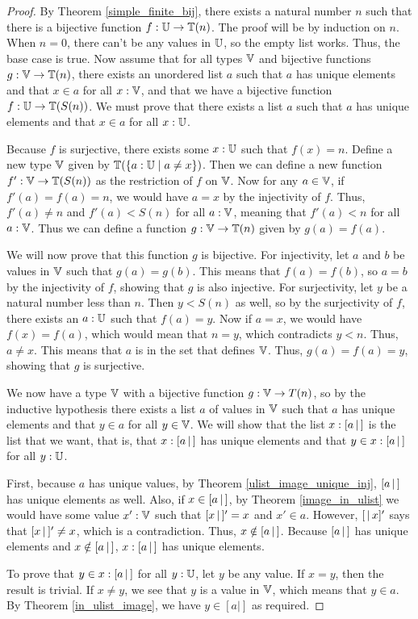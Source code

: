 \documentclass[../../math.tex]{subfiles}
\begin{document}
\begin{proof}
    By Theorem \ref{simple_finite_bij}, there exists a natural number $n$ such
    that there is a bijective function $f : \mathbb{U} \to \mathbb{T}(n)$.  The proof will be by
    induction on $n$.  When $n = 0$, there can't be any values in $\mathbb{U}$, so the
    empty list works.  Thus, the base case is true.  Now assume that for all
    types $\mathbb{V}$ and bijective functions $g : \mathbb{V} \to \mathbb{T}(n)$, there exists an
    unordered list $a$ such that $a$ has unique elements and that $x \in a$ for
    all $x : \mathbb{V}$, and that we have a bijective function $f : \mathbb{U} \to \mathbb{T}(S(n))$.
    We must prove that there exists a list $a$ such that $a$ has unique elements
    and that $x \in a$ for all $x : \mathbb{U}$.

    Because $f$ is surjective, there exists some $x : \mathbb{U}$ such that $f(x) = n$.
    Define a new type $\mathbb{V}$ given by $\mathbb{T}(\{a : \mathbb{U} \mid a \neq x\})$.  Then we can
    define a new function $f' : \mathbb{V} \to \mathbb{T}(S(n))$ as the restriction of $f$ on
    $\mathbb{V}$.  Now for any $a \in \mathbb{V}$, if $f'(a) = f(a) = n$, we would have $a = x$
    by the injectivity of $f$.  Thus, $f'(a) \neq n$ and $f'(a) < S(n)$ for all
    $a : \mathbb{V}$, meaning that $f'(a) < n$ for all $a : \mathbb{V}$.  Thus we can define a
    function $g : \mathbb{V} \to \mathbb{T}(n)$ given by $g(a) = f(a)$.

    We will now prove that this function $g$ is bijective.  For injectivity, let
    $a$ and $b$ be values in $\mathbb{V}$ such that $g(a) = g(b)$.  This means that
    $f(a) = f(b)$, so $a = b$ by the injectivity of $f$, showing that $g$ is
    also injective.  For surjectivity, let $y$ be a natural number less than
    $n$.  Then $y < S(n)$ as well, so by the surjectivity of $f$, there exists
    an $a : \mathbb{U}$ such that $f(a) = y$.  Now if $a = x$, we would have $f(x) =
    f(a)$, which would mean that $n = y$, which contradicts $y < n$.  Thus, $a
    \neq x$.  This means that $a$ is in the set that defines $\mathbb{V}$.  Thus, $g(a)
    = f(a) = y$, showing that $g$ is surjective.

    We now have a type $\mathbb{V}$ with a bijective function $g : \mathbb{V} \to T(n)$, so by
    the inductive hypothesis there exists a list $a$ of values in $\mathbb{V}$ such that
    $a$ has unique elements and that $y \in a$ for all $y \in \mathbb{V}$.  We will show
    that the list $x : [ a\, |\,]$ is the list that we want, that is, that $x
    :[ a\, |\,]$ has unique elements and that $y \in x :[ a\, |\,]$ for all $y : \mathbb{U}$.

    First, because $a$ has unique values, by Theorem
    \ref{ulist_image_unique_inj}, $[ a\, |\,]$ has unique elements as well.  Also,
    if $x \in [ a\, |\,]$, by Theorem \ref{image_in_ulist} we would have some value
    $x' : \mathbb{V}$ such that $[ x\, |\,]' = x$ and $x' \in a$.  However, $[ \,|\, x ]'$ says
    that $[ x\, |\,]' \neq x$, which is a contradiction.  Thus, $x \notin [ a\, |\,]$.
    Because $[ a\, |\,]$ has unique elements and $x \notin [ a\, |\,]$, $x : [ a\, |\,]$ has
    unique elements.

    To prove that $y \in x : [ a\, |\,]$ for all $y : \mathbb{U}$, let $y$ be any value.  If
    $x = y$, then the result is trivial.  If $x \neq y$, we see that $y$ is a
    value in $\mathbb{V}$, which means that $y \in a$.  By Theorem \ref{in_ulist_image},
    we have $y \in [a|]$ as required.
\end{proof}
\end{document}

